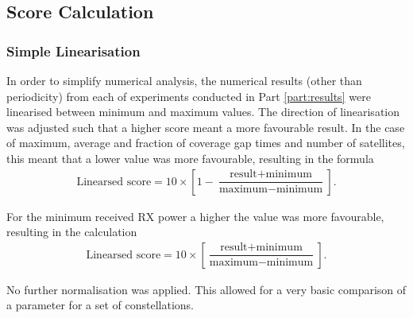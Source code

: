 \subsection{Score Calculation}
  
\subsubsection{Simple Linearisation}
In order to simplify numerical analysis, the numerical results (other than periodicity) from each of experiments conducted in Part \ref{part:results} were linearised between minimum and maximum values. The direction of linearisation was adjusted such that a higher score meant a more favourable result. In the case of maximum, average and fraction of coverage gap times and number of satellites, this meant that a lower value was more favourable, resulting in the formula
\begin{align}
	\text{Linearsed score} = 10 \times \left[1 - \dfrac{\text{result} + \text{minimum}}{\text{maximum} - \text{minimum}}\right]. \label{eqn:linearisation}
\end{align}

For the minimum received RX power a higher the value was more favourable, resulting in the calculation 
\begin{align}
	\text{Linearsed score} = 10 \times \left[\dfrac{\text{result} + \text{minimum}}{\text{maximum} - \text{minimum}}\right]. \label{eqn:linearisation_up}
\end{align}

No further normalisation was applied. This allowed for a very basic comparison of a parameter for a set of constellations. 

